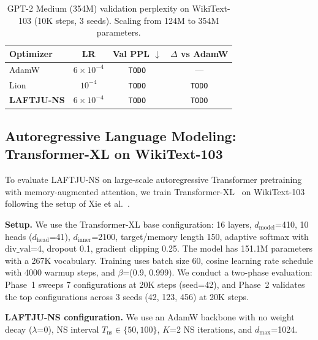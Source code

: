 \documentclass[10pt,twocolumn]{article}
\newcommand{\method}{LAFTJU}
\begin{document}
\begin{table}[t]
\centering
\caption{GPT-2 Medium (354M) validation perplexity on WikiText-103 (10K steps, 3 seeds). Scaling from 124M to 354M parameters.}
\label{tab:gpt2_medium}
\small
\begin{tabular}{@{}lccc@{}}
\toprule
\textbf{Optimizer} & \textbf{LR} & \textbf{Val PPL $\downarrow$} & \textbf{$\Delta$ vs AdamW} \\
\midrule
AdamW                    & $6\times10^{-4}$ & \texttt{TODO} & --- \\
Lion~\cite{lion}         & $10^{-4}$        & \texttt{TODO} & \texttt{TODO} \\
\textbf{\method{}-NS}    & $6\times10^{-4}$ & \texttt{TODO} & \texttt{TODO} \\
\bottomrule
\end{tabular}
\end{table}

\subsection{Autoregressive Language Modeling: Transformer-XL on WikiText-103}
\label{sec:txl}

To evaluate \method{}-NS on large-scale autoregressive Transformer pretraining with memory-augmented attention, we train Transformer-XL~\cite{txl} on WikiText-103~\cite{wikitext} following the setup of Xie et al.~\cite{adan}.

\textbf{Setup.} We use the Transformer-XL base configuration: 16 layers, $d_\mathrm{model}$=410, 10 heads ($d_\mathrm{head}$=41), $d_\mathrm{inner}$=2100, target/memory length 150, adaptive softmax with $\mathrm{div\_val}$=4, dropout 0.1, gradient clipping 0.25. The model has 151.1M parameters with a 267K vocabulary. Training uses batch size 60, cosine learning rate schedule with 4000 warmup steps, and $\beta$=(0.9, 0.999). We conduct a two-phase evaluation: Phase~1 sweeps 7 configurations at 20K steps (seed=42), and Phase~2 validates the top configurations across 3 seeds (42, 123, 456) at 20K steps.

\textbf{\method{}-NS configuration.} We use an AdamW backbone with no weight decay ($\lambda$=0), NS interval $T_\mathrm{ns} \in \{50, 100\}$, $K$=2 NS iterations, and $d_\mathrm{max}$=1024.
\end{document}
